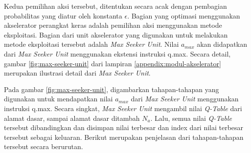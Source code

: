 Kedua pemilihan aksi tersebut, ditentukan secara acak dengan pembagian probabilitas yang diatur oleh konstanta $\epsilon$. Bagian yang optimasi menggunakan akselerator perangkat keras adalah pemilihan aksi menggunakan metode eksploitasi. Bagian dari unit akselerator yang digunakan untuk melakukan metode eksploitasi tersebut adalah \textit{Max Seeker Unit}. Nilai $a_{max}$ akan didapatkan dari \textit{Max Seeker Unit} menggunakan ekstensi instruksi q.max. Secara detail, gambar \ref{fig:max-seeker-unit} dari lampiran \ref{appendix:modul-akselerator} merupakan ilustrasi detail dari \textit{Max Seeker Unit}.

Pada gambar \ref{fig:max-seeker-unit}, digambarkan tahapan-tahapan yang digunakan untuk mendapatkan nilai $a_{max}$ dari \textit{Max Seeker Unit} menggunakan instruksi q.max. Secara singkat, \textit{Max Seeker Unit} mengambil nilai \textit{Q-Table} dari alamat dasar, sampai alamat dasar ditambah $N_a$. Lalu, semua nilai \textit{Q-Table} tersebut dibandingkan dan disimpan nilai terbesar dan index dari nilai terbesar tersebut sebagai keluaran. Berikut merupakan penjelasan dari tahapan-tahapan tersebut secara berurutan.

